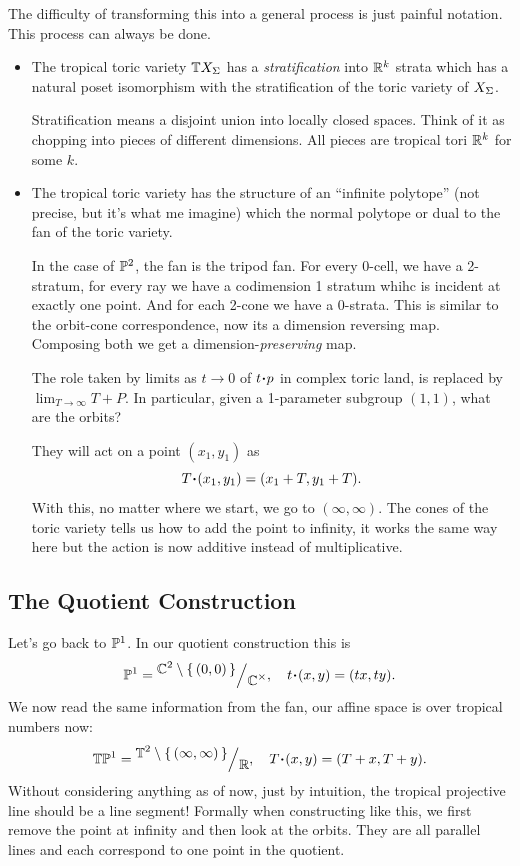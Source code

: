 \documentclass[12pt]{memoir}
\begin{document}
The difficulty of transforming this into a general process is just painful notation. This process can always be done.

\begin{itemize}
    \item The tropical toric variety $\mathbb{T} X_\Sigma$ has a \emph{stratification} into $\mathbb{R}^k$ strata which has a natural poset isomorphism with the stratification of the toric variety of $X_\Sigma$.\par 
     Stratification means a disjoint union into locally closed spaces. Think of it as chopping into pieces of different dimensions. All pieces are tropical tori $\mathbb{R}^k$ for some $k$. 
    \item The tropical toric variety has the structure of an ``infinite polytope'' (not precise, but it's what me imagine) which the normal polytope or dual to the fan of the toric variety.\par 
    In the case of $\mathbb{P}^2$, the fan is the tripod fan. For every 0-cell, we have a 2-stratum, for every ray we have a codimension 1 stratum whihc is incident at exactly one point. And for each 2-cone we have a 0-strata. This is similar to the orbit-cone correspondence, now its a dimension reversing map. Composing both we get a dimension-\emph{preserving} map. \par 
    The role taken by limits as $t\to 0$ of $t\.p$ in complex toric land, is replaced by $\lim_{T\to\infty}T+P$. In particular, given a 1-parameter subgroup $(1,1)$, what are the orbits?\par 
    They will act on a point $(x_1,y_1)$ as 
    $$T\.(x_1,y_1)=(x_1+T,y_1+T).$$
    With this, no matter where we start, we go to $(\infty,\infty)$. The cones of the toric variety tells us how to add the point to infinity, it works the same way here but the action is now additive instead of multiplicative. 
\end{itemize}

\subsection{The Quotient Construction}

Let's go back to $\mathbb{P}^1$. In our quotient construction this is 
$$\bP^1=\quot{\bC^2\less\set{(0,0)}}{\bC^\x},\quad t\.(x,y)=(tx,ty).$$
We now read the same information from the fan, our affine space is over tropical numbers now:
$$\bT\bP^1=\quot{\bT^2\less\set{(\infty,\infty)}}{\bR},\quad T\.(x,y)=(T+x,T+y).$$
Without considering anything as of now, just by intuition, the tropical projective line should be a line segment! Formally when constructing like this, we first remove the point at infinity and then look at the orbits. They are all parallel lines and each correspond to one point in the quotient. 
\end{document}
